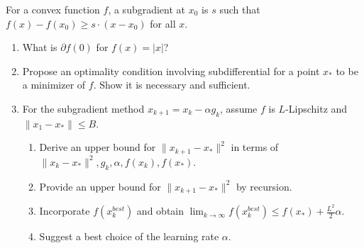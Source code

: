 \begin{exercise}
\label{applied:2018:10}
For a convex function $f$, a subgradient at $x_0$ is $s$ such that $f(x) - f(x_0) \geq s \cdot (x - x_0)$ for all $x$.
\begin{enumerate}
    \item What is $\partial f(0)$ for $f(x) = |x|$?
    \item Propose an optimality condition involving subdifferential for a point $x_*$ to be a minimizer of $f$. Show it is necessary and sufficient.
    \item For the subgradient method $x_{k+1} = x_k - \alpha g_k$, assume $f$ is $L$-Lipschitz and $\|x_1 - x_*\| \leq B$.
    \begin{enumerate}
        \item Derive an upper bound for $\|x_{k+1} - x_*\|^2$ in terms of $\|x_k - x_*\|^2, g_k, \alpha, f(x_k), f(x_*)$.
        \item Provide an upper bound for $\|x_{k+1} - x_*\|^2$ by recursion.
        \item Incorporate $f(x_k^{best})$ and obtain $\lim_{k \to \infty} f(x_k^{best}) \leq f(x_*) + \frac{L^2}{2}\alpha$.
        \item Suggest a best choice of the learning rate $\alpha$.
    \end{enumerate}
\end{enumerate}
\end{exercise}

